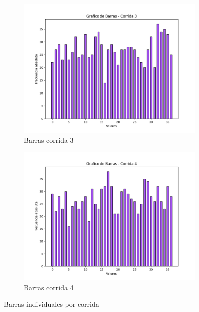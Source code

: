 \documentclass{article}
\begin{document}
\begin{figure}[htbp]
    \vspace{0.5cm}
    
    \begin{subfigure}[b]{0.45\textwidth}
        \centering
        \includegraphics[width=\textwidth]{Imagenes/Barras_corrida_3.png}
        \caption{Barras corrida 3}
    \end{subfigure}
    \hfill
    \begin{subfigure}[b]{0.45\textwidth}
        \centering
        \includegraphics[width=\textwidth]{Imagenes/Barras_corrida_4.png}
        \caption{Barras corrida 4}
    \end{subfigure}

    \caption{Barras individuales por corrida}
    \label{fig:collage}
\end{figure}
\end{document}
